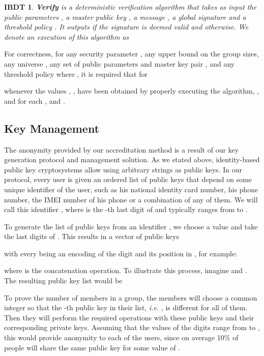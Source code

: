 \documentclass[11pt]{llncs}
\newtheorem{ibdtproto}{IBDT}
\begin{document}
\begin{ibdtproto}\label{ab.ibdtproto.verify}
\textbf{Verify} is a deterministic verification algorithm
that takes as input the public parameters ,
a master public key , a message ,
a global signature  and a threshold policy .
It outputs  if the signature is deemed valid and  otherwise.
We denote an execution of this algorithm as

\end{ibdtproto}

For correctness, for any security parameter ,
any upper bound  on the group sizes, any universe ,
any set of public parameters and master key pair
,
and any threshold policy  where , it is required that for


whenever the values , , 
have been obtained by properly executing the
 algorithm, , and for each
,
 and
.


\subsection{Key Management}\label{ab.subsec.keymgnt}

The anonymity provided by our accreditation method is
a result of our key generation protocol and management solution.
As we stated above, identity-based public key cryptosystems
allow using arbitrary strings as public keys.
In our protocol, every user  is given an ordered list
of public keys that
depend on some unique identifier of the user, such as his
national identity card number, his phone number, the
IMEI number of his phone or a combination of any of them.
We will call this identifier ,
where  is the -th last digit of 
and typically ranges from  to .

To generate the list of public keys from an identifier ,
we choose a value  and take the  last digits
of .
This results in a vector of public keys

with every  being an encoding of the
digit and its position in , for example:

where  is the concatenation operation.
To illustrate this process, imagine 
and . The resulting public key list would be


To prove the number of members in a group,
the members will choose a common integer 
so that the -th public key in their list, \emph{i.e.}
, is different for all of them.
Then they will perform the required operations with these public
keys and their corresponding private keys.
Assuming that the values of the digits range from
 to , this would provide anonymity to each
of the users, since on average 10\% of people
will share the same public key 
for some value of .
\end{document}

